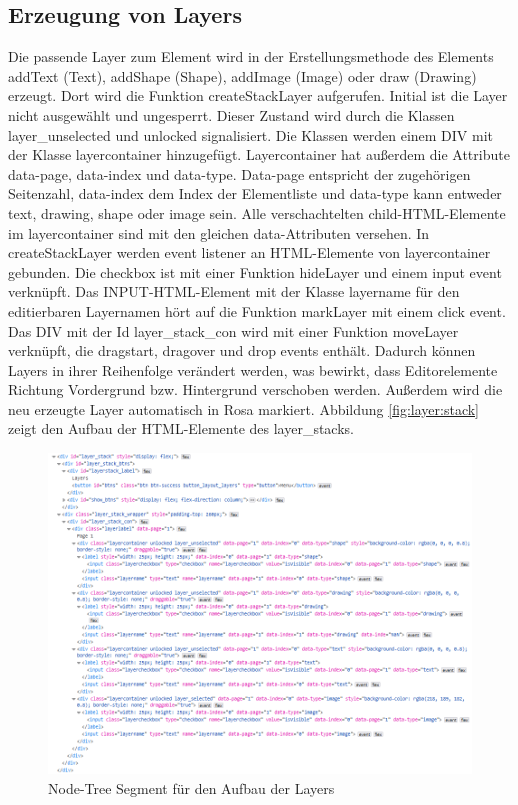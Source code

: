 \subsection{Erzeugung von Layers}
Die passende Layer zum Element wird in der Erstellungsmethode des Elements addText (Text), addShape (Shape), addImage (Image) oder draw (Drawing) erzeugt. Dort wird die Funktion  createStackLayer aufgerufen. Initial ist die Layer nicht ausgewählt und ungesperrt. Dieser Zustand wird durch die Klassen layer\_unselected und unlocked signalisiert. Die Klassen werden einem DIV mit der Klasse layercontainer hinzugefügt. Layercontainer hat außerdem die Attribute data-page, data-index und data-type. Data-page entspricht der zugehörigen Seitenzahl, data-index dem Index der Elementliste und data-type kann entweder text, drawing, shape oder image sein. Alle verschachtelten child-HTML-Elemente im layercontainer sind mit den gleichen data-Attributen versehen. In createStackLayer werden event listener an HTML-Elemente von layercontainer gebunden. Die checkbox ist mit einer Funktion hideLayer und einem input event verknüpft. Das INPUT-HTML-Element mit der Klasse layername für den editierbaren Layernamen hört auf die Funktion markLayer mit einem click event. Das DIV mit der Id layer\_stack\_con wird mit einer Funktion moveLayer verknüpft, die dragstart, dragover und drop events enthält. Dadurch können Layers in ihrer Reihenfolge verändert werden, was bewirkt, dass Editorelemente Richtung Vordergrund bzw. Hintergrund verschoben werden. Außerdem wird die neu erzeugte Layer automatisch in Rosa markiert. Abbildung \ref{fig:layer:stack} zeigt den Aufbau der HTML-Elemente des layer\_stacks.

\begin{figure}[!htbp]
	\centering
	\includegraphics[width=1\textwidth]{"images/layer-stack.png"}
	\caption{Node-Tree Segment für den Aufbau der Layers}
	\label{fig:layer-stack}
\end{figure}


